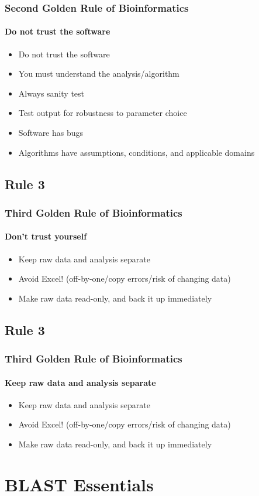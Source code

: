 \documentclass[table]{beamer}
\begin{document}
  \begin{frame}
    \frametitle{Second Golden Rule of Bioinformatics}
    \framesubtitle{Do not trust the software}
	\begin{itemize}
	  \item Do not trust the software
	  \item You must understand the analysis/algorithm
	  \item Always sanity test
	  \item Test output for robustness to parameter choice
	  \item Software has bugs
	  \item Algorithms have assumptions, conditions, and applicable domains
	\end{itemize}
  \end{frame}

  \subsection{Rule 3}
  \begin{frame}
    \frametitle{Third Golden Rule of Bioinformatics}
    \framesubtitle{Don't trust yourself}
	\begin{itemize}
	  \item Keep raw data and analysis separate
	  \item Avoid Excel! (off-by-one/copy errors/risk of changing data)
	  \item Make raw data read-only, and back it up immediately
	\end{itemize}
  \end{frame}

  \subsection{Rule 3}
  \begin{frame}
    \frametitle{Third Golden Rule of Bioinformatics}
    \framesubtitle{Keep raw data and analysis separate}
	\begin{itemize}
	  \item Keep raw data and analysis separate
	  \item Avoid Excel! (off-by-one/copy errors/risk of changing data)
	  \item Make raw data read-only, and back it up immediately
	\end{itemize}
  \end{frame}


  \section{BLAST Essentials}
  
\end{document}
